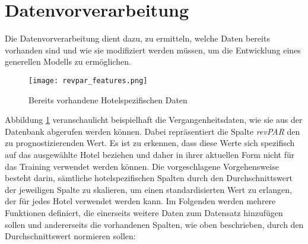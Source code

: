 \section{Datenvorverarbeitung}
\label{subsec:revpar_prepare}
Die Datenvorverarbeitung dient dazu, zu ermitteln, welche Daten bereits vorhanden sind und wie sie modifiziert werden müssen, um die Entwicklung eines generellen Modells zu ermöglichen.
\newpage
\begin{figure}[h]
    \centering
    \texttt{[image: revpar\_features.png]}
    \caption[Bereits vorhandene Hotelspezifischen Daten]{Bereits vorhandene Hotelspezifischen Daten}
    \label{img:revpar_features}
\end{figure}

Abbildung \ref{img:revpar_features} veranschaulicht beispielhaft die Vergangenheitsdaten, wie sie aus der Datenbank abgerufen werden können. Dabei repräsentiert die Spalte \emph{revPAR} den zu prognostizierenden Wert. Es ist zu erkennen, dass diese Werte sich spezifisch auf das ausgewählte Hotel beziehen und daher in ihrer aktuellen Form nicht für das Training verwendet werden können. Die vorgeschlagene Vorgehensweise besteht darin, sämtliche hotelspezifischen Spalten durch den Durchschnittswert der jeweiligen Spalte zu skalieren, um einen standardisierten Wert zu erlangen, der für jedes Hotel verwendet werden kann.
\newline 
\newline
Im Folgenden werden mehrere Funktionen definiert, die einerseits weitere Daten zum Datensatz hinzufügen sollen und andererseits die vorhandenen Spalten, wie oben beschrieben, durch den Durchschnittswert normieren sollen:

